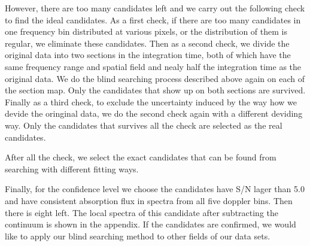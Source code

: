 \documentclass[prl,twocolumn,floatfix,superscriptaddress,nofootinbib,aps]{revtex4}
\begin{document}
However, there are too many candidates left and we carry out the following check to find the ideal candidates. As a first check, if there are too many candidates in one frequency bin distributed at various pixels, or the distribution of them is regular, we eliminate these candidates. Then as a second check, we divide the original data into two sections in the integration time, both of which have the same frequency range and spatial field and nealy half the integration time as the original data. We do the blind searching process described above again on each of the section map. Only the candidates that show up on both sections are survived. Finally as a third check, to exclude the uncertainty induced by the way how we devide the oringinal data, we do the second check again with a different deviding way. Only the candidates that survives all the check are selected as the real candidates.

After all the check, we select the exact candidates that can be found from searching with different fitting ways.

Finally, for the confidence level we choose the candidates have S/N lager than 5.0 and have consistent absorption flux in spectra from all five doppler bins. Then there is eight left. The local spectra of this candidate after subtracting the continuum is shown in the appendix.
If the candidates are confirmed, we would like to apply our blind searching method
to other fields of our data sets.



%
\end{document}
